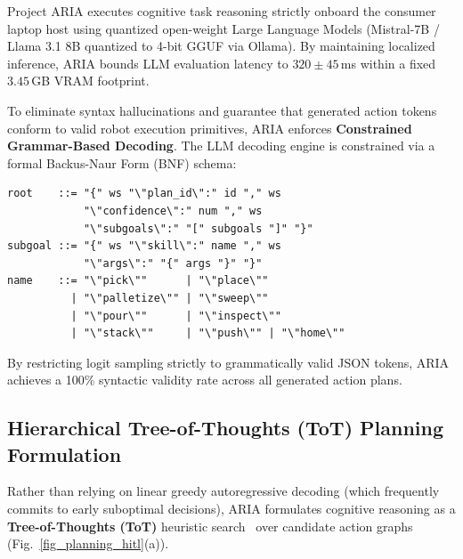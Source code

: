 \documentclass[journal]{IEEEtran}
\begin{document}
Project ARIA executes cognitive task reasoning strictly onboard the consumer laptop host using quantized open-weight Large Language Models (Mistral-7B / Llama 3.1 8B quantized to 4-bit GGUF via Ollama). By maintaining localized inference, ARIA bounds LLM evaluation latency to $320 \pm 45$\,ms within a fixed $3.45$\,GB VRAM footprint.

To eliminate syntax hallucinations and guarantee that generated action tokens conform to valid robot execution primitives, ARIA enforces \textbf{Constrained Grammar-Based Decoding}. The LLM decoding engine is constrained via a formal Backus-Naur Form (BNF) schema:
{\scriptsize
\begin{verbatim}
root    ::= "{" ws "\"plan_id\":" id "," ws 
            "\"confidence\":" num "," ws 
            "\"subgoals\":" "[" subgoals "]" "}"
subgoal ::= "{" ws "\"skill\":" name "," ws 
            "\"args\":" "{" args "}" "}"
name    ::= "\"pick\""      | "\"place\"" 
          | "\"palletize\"" | "\"sweep\"" 
          | "\"pour\""      | "\"inspect\"" 
          | "\"stack\""     | "\"push\"" | "\"home\""
\end{verbatim}
}
By restricting logit sampling strictly to grammatically valid JSON tokens, ARIA achieves a 100\% syntactic validity rate across all generated action plans.

\subsection{Hierarchical Tree-of-Thoughts (ToT) Planning Formulation}
Rather than relying on linear greedy autoregressive decoding (which frequently commits to early suboptimal decisions), ARIA formulates cognitive reasoning as a \textbf{Tree-of-Thoughts (ToT)} heuristic search~\cite{aria_132_yao_2023_tree} over candidate action graphs (Fig.~\ref{fig_planning_hitl}(a)).
\end{document}
